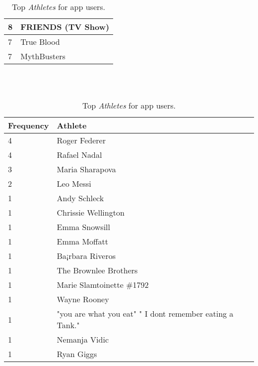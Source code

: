 \begin{table}[h]
\begin{minipage}[b]{.50\textwidth}
\begin{tabular}{|l|l|}
		8 & FRIENDS (TV Show) \\ \hline
		7 & True Blood \\ \hline
		7 & MythBusters \\ \hline
  \end{tabular}
  \caption{Top \emph{Television} shows for app users.}
\end{minipage}
\\
\\
\begin{minipage}[b]{1.0\textwidth}
\centering
  \begin{tabular}{|l|l|} %
  \hline
  		\textbf{Frequency} & \textbf{Athlete} \\ \hline
  		4 & Roger Federer \\ \hline
		4 & Rafael Nadal \\ \hline
		3 & Maria Sharapova \\ \hline
		2 & Leo Messi \\ \hline
		1 & Andy Schleck \\ \hline
		1 & Chrissie Wellington \\ \hline
		1 & Emma Snowsill \\ \hline
		1 & Emma Moffatt \\ \hline
		1 & Ba¡rbara Riveros \\ \hline
		1 & The Brownlee Brothers \\ \hline
		1 & Marie Slamtoinette \#1792 \\ \hline
		1 & Wayne Rooney \\ \hline
		1 & "you are what you eat" " I dont remember eating a Tank." \\ \hline
		1 & Nemanja Vidic \\ \hline
		1 & Ryan Giggs \\ \hline
  \end{tabular}
  \caption{Top \emph{Athletes} for app users.}
\end{minipage}
\end{table}

